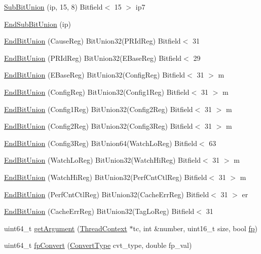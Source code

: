 \begin{DoxyCompactItemize}
\item 
\hyperlink{namespaceMipsISA_aebb7b725b738cf03d41045fe15187006}{SubBitUnion} (ip, 15, 8) Bitfield$<$ 15 $>$ ip7
\item 
\hyperlink{namespaceMipsISA_acb2250639af71811d86378b81ff254b0}{EndSubBitUnion} (ip)
\item 
\hyperlink{namespaceMipsISA_aaf9dde73d3cec4f4299b5b866a53975f}{EndBitUnion} (CauseReg) BitUnion32(PRIdReg) Bitfield$<$ 31
\item 
\hyperlink{namespaceMipsISA_ab70b4ed27a0905d02b3e81907e8198b7}{EndBitUnion} (PRIdReg) BitUnion32(EBaseReg) Bitfield$<$ 29
\item 
\hyperlink{namespaceMipsISA_a76be583b407d10bf151b7d44b33d9fbe}{EndBitUnion} (EBaseReg) BitUnion32(ConfigReg) Bitfield$<$ 31 $>$ m
\item 
\hyperlink{namespaceMipsISA_aa56e600b9c6344fc7fd639bb6779378e}{EndBitUnion} (ConfigReg) BitUnion32(Config1Reg) Bitfield$<$ 31 $>$ m
\item 
\hyperlink{namespaceMipsISA_a14d2f00833660e452a0f7efb07dcea19}{EndBitUnion} (Config1Reg) BitUnion32(Config2Reg) Bitfield$<$ 31 $>$ m
\item 
\hyperlink{namespaceMipsISA_afdd998372394702fe2de2e4d5a0480f9}{EndBitUnion} (Config2Reg) BitUnion32(Config3Reg) Bitfield$<$ 31 $>$ m
\item 
\hyperlink{namespaceMipsISA_a58a2abbc3433688e1ee0083a7dd7001b}{EndBitUnion} (Config3Reg) BitUnion64(WatchLoReg) Bitfield$<$ 63
\item 
\hyperlink{namespaceMipsISA_a1b5b420a450d8d1d2436f7c8558e65c2}{EndBitUnion} (WatchLoReg) BitUnion32(WatchHiReg) Bitfield$<$ 31 $>$ m
\item 
\hyperlink{namespaceMipsISA_ae140b2b16da5e91f8048be7ae8764a4a}{EndBitUnion} (WatchHiReg) BitUnion32(PerfCntCtlReg) Bitfield$<$ 31 $>$ m
\item 
\hyperlink{namespaceMipsISA_aad6da03f58562dcac647243534841a82}{EndBitUnion} (PerfCntCtlReg) BitUnion32(CacheErrReg) Bitfield$<$ 31 $>$ er
\item 
\hyperlink{namespaceMipsISA_a78f47097e3bcf7a332c355f3e830c0f0}{EndBitUnion} (CacheErrReg) BitUnion32(TagLoReg) Bitfield$<$ 31
\item 
uint64\_\-t \hyperlink{namespaceMipsISA_a3f9560369e934be05b1dd8f23fbd6104}{getArgument} (\hyperlink{classThreadContext}{ThreadContext} $\ast$tc, int \&number, uint16\_\-t size, bool \hyperlink{namespaceMipsISA_a3233167b16e632eb21dbd7f259511ddd}{fp})
\item 
uint64\_\-t \hyperlink{namespaceMipsISA_aef24bb5b95ababfcc53737354f899410}{fpConvert} (\hyperlink{namespaceMipsISA_a3eb2ef7126c12e67d97d307c7aaa381d}{ConvertType} cvt\_\-type, double fp\_\-val)

\end{DoxyCompactItemize}
